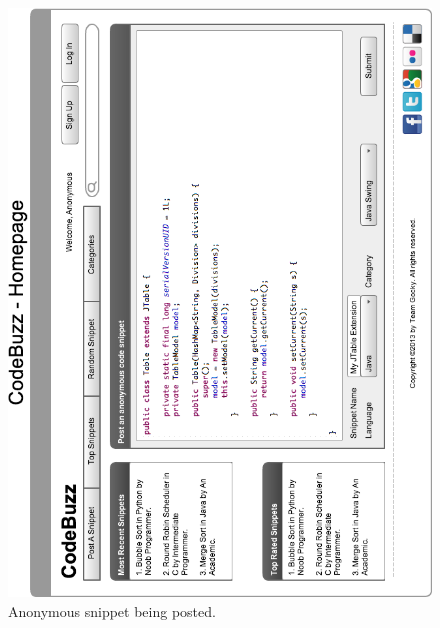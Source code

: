 \documentclass[11pt,a4paper]{article}
\begin{document}
\begin{figure}
\includegraphics[width=\textwidth]{../imgs/homepageWireFrameGRHorz.png}
\caption{Anonymous snippet being posted.}
\label{fig:anonsnippet}
\end{figure}
\end{document}
